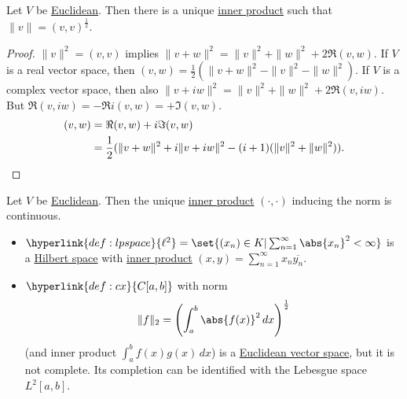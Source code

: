 \documentclass{article}
\begin{document}
\begin{fact}
    Let $V$ be \hyperlink{def:euclidean}{Euclidean}.
    Then there is a unique \hyperlink{def:ip}{inner product} such that $\|v\| = (v,v)^\frac{1}{2}$.
\end{fact}

\begin{proof}
    $\|v\|^2 = (v,v)$ implies $\|v+w\|^2 = \|v\|^2 + \|w\|^2 + 2 \Re(v, w)$.
    If $V$ is a real vector space, then $(v, w) = \frac{1}{2}(\|v+w\|^2 - \|v\|^2 - \|w\|^2)$.
    If $V$ is a complex vector space, then also $\|v + iw\|^2 = \|v\|^2 + \|w\|^2 + 2 \Re(v, iw)$. But $\Re(v, iw) = -\Re i (v, w) = + \Im(v, w)$.
    \begin{align*}
        (v, w) &= \Re (v, w) + i \Im (v, w)  \\
               &= \frac{1}{2} (\|v+w\|^2 + i \|v + i w\|^2 - (i+1) (\|v\|^2 + \|w\|^2)).\qedhere
    \end{align*}
\end{proof}

\begin{fact}
    Let $V$ be \hyperlink{def:euclidean}{Euclidean}.
    Then the unique \hyperlink{def:ip}{inner product} $(\cdot, \cdot)$ inducing the norm is continuous.
\end{fact}


\begin{eg}
    \leavevmode
    \begin{itemize}
        \item $\hyperlink{def:lpspace}{\ell^2} = \set{(x_n) \in K | \sum_{n=1}^\infty \abs{x_n}^2 < \infty}$ is a \hyperlink{def:euclidean}{Hilbert space} with \hyperlink{def:ip}{inner product} $(x, y) = \sum_{n=1}^\infty x_n \overline{y_n}$.
        \item $\hyperlink{def:cx}{C[a, b]}$ with norm
            \begin{equation*}
                \|f\|_2 = \left(\int_a^b \abs{f(x)}^2\, dx \right)^\frac{1}{2}
            \end{equation*}
            (and inner product $\int_a^b f(x) g(x) \, dx$) is a \hyperlink{def:euclidean}{Euclidean vector space}, but it is not complete.
            Its completion can be identified with the Lebesgue space $L^2[a, b]$.
    \end{itemize}
\end{eg}
\end{document}
